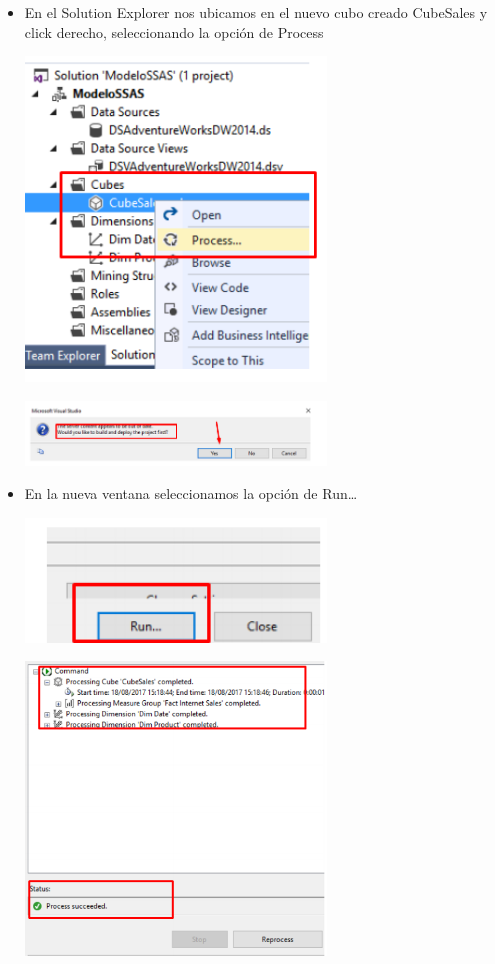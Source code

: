 \begin{itemize}
	 \item En el Solution Explorer nos ubicamos en el nuevo cubo creado CubeSales y click derecho, seleccionando la
opción de Process 
	\begin{center}
	\includegraphics[width=8cm]{./Imagenes/img22}
	\end{center}	
	\begin{center}
	\includegraphics[width=8cm]{./Imagenes/img23}
	\end{center}	
	 \item En la nueva ventana seleccionamos la opción de Run…
	\begin{center}
	\includegraphics[width=8cm]{./Imagenes/img24}
	\end{center}
	\begin{center}
	\includegraphics[width=8cm]{./Imagenes/img25}

\end{center}
\end{itemize}
